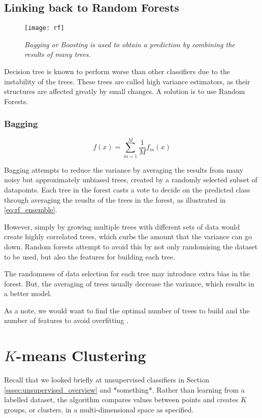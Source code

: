 \subsection{Linking back to Random Forests}

\begin{figure}[H]
  \centering
  \texttt{[image: rf]}
  \caption{\textit{Bagging or Boosting is used to obtain a prediction by combining the results of many trees.}}
  \label{fig:rf}
\end{figure}

Decision tree is known to perform worse than other classifiers due to the instability of the trees. These trees are called high variance estimators, as their structures are affected greatly by small changes. A solution is to use Random Forests. 

\subsubsection{Bagging}

\begin{equation} \label{eq:rf_ensemble}
  f(x) = \sum_{m=1}^M \frac{1}{M}f_m(x)
\end{equation}

Bagging attempts to reduce the variance by averaging the results from many noisy but approximately unbiased trees, created by a randomly selected subset of datapoints. Each tree in the forest casts a vote to decide on the predicted class through averaging the reuslts of the trees in the forest, as illustrated in \autoref{eq:rf_ensemble}.

However, simply by growing multiple trees with different sets of data would create highly correlated trees, which curbs the amount that the variance can go down. Random forests attempt to avoid this by not only randomising the dataset to be used, but also the features for building each tree. 

The randomness of data selection for each tree may introduce extra bias in the forest. But, the averaging of trees usually decrease the variance, which results in a better model.

As a note, we would want to find the optimal number of trees to build and the number of features to avoid overfitting \cite{scikit-doc}.


\newpage
\section{$K$-means Clustering}
Recall that we looked briefly at unsupervised classifiers in Section \ref{sssec:unsupervised_overview} and *something*. Rather than learning from a labelled dataset, the algorithm compares values between points and creates $K$ groups, or clusters, in a multi-dimensional space as specified.

